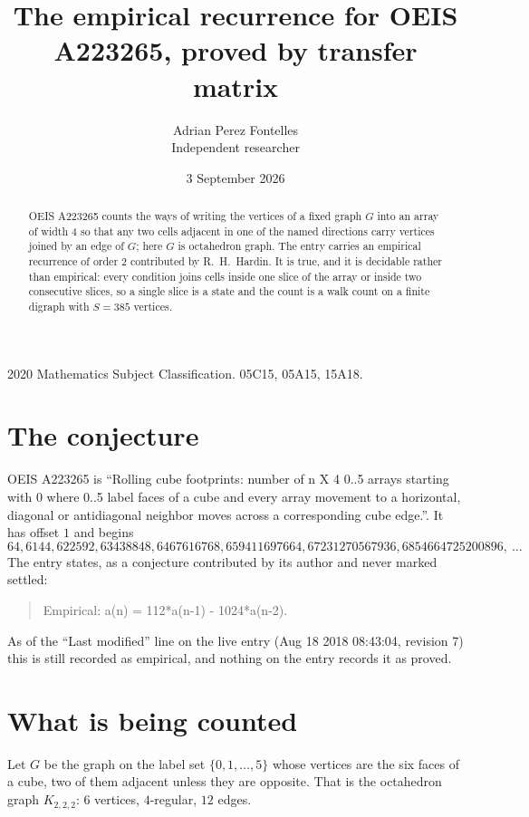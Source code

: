 \documentclass[11pt,a4paper]{article}
\title{The empirical recurrence for OEIS A223265, proved by transfer matrix}
\author{Adrian Perez Fontelles\\ \small Independent researcher}
\date{3 September 2026}
\theoremstyle{plain}
\theoremstyle{definition}
\begin{document}
\maketitle

\begin{abstract}
OEIS A223265 counts the ways of writing the vertices of a fixed graph $G$ into an array of width
$4$ so that any two cells adjacent in one of the named directions carry vertices joined by an
edge of $G$; here $G$ is octahedron graph. The entry carries an empirical recurrence of order $2$
contributed by R.~H.~Hardin. It is true, and it is decidable rather than empirical: every
condition joins cells inside one slice of the array or inside two consecutive slices, so a
single slice is a state and the count is a walk count on a finite digraph with $S=385$ vertices.
\end{abstract}

\noindent\small 2020 Mathematics Subject Classification. 05C15, 05A15, 15A18.\normalsize

\section{The conjecture}

OEIS A223265 is ``Rolling cube footprints: number of n X 4 0..5 arrays starting with 0 where 0..5 label faces of a cube and every array movement to a horizontal, diagonal or antidiagonal neighbor moves across a corresponding cube edge.''. It has offset $1$ and begins
\[
64, 6144, 622592, 63438848, 6467616768, 659411697664, 67231270567936, 6854664725200896,\ \dots
\]
The entry states, as a conjecture contributed by its author and never marked settled:
\begin{quote}
Empirical: a(n) = 112*a(n-1) - 1024*a(n-2).
\end{quote}
As of the ``Last modified'' line on the live entry (Aug 18 2018 08:43:04, revision 7) this is still
recorded as empirical, and nothing on the entry records it as proved.

\section{What is being counted}

Let $G$ be the graph on the label set $\{0,1,\dots,5\}$ whose vertices are the six faces of a cube, two of them adjacent unless they are opposite. That is the octahedron graph $K_{2,2,2}$: $6$ vertices, $4$-regular, $12$ edges.
\end{document}
